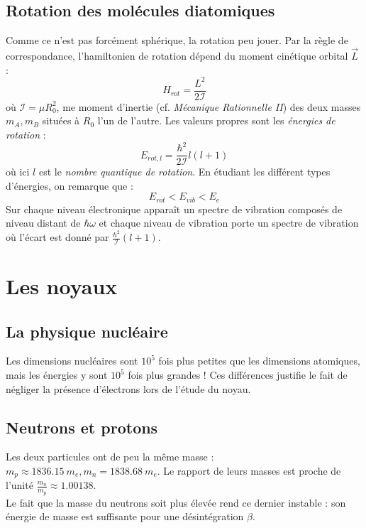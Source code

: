 \documentclass	[11pt, a4paper, openany]{book}
\begin{document}
\section{Rotation des molécules diatomiques}
Comme ce n'est pas forcément sphérique, la rotation peu jouer. Par la règle de correspondance, 
l'hamiltonien de rotation dépend du moment cinétique orbital $\vec{L}$ :
\begin{equation}
H_{rot} = \frac{L^2}{2\mathcal{I}}
\end{equation}
où $\mathcal{I} = \mu R_0^2$, me moment d'inertie (cf. \textit{Mécanique Rationnelle II}) des deux 
masses $m_A,m_B$ situées à $R_0$ l'un de l'autre.  Les valeurs propres sont les \textit{énergies de 
rotation} :
\begin{equation}
E_{rot,l} = \frac{\hbar^2}{2\mathcal{I}}l(l+1)
\end{equation}
où ici $l$ est le \textit{nombre quantique de rotation}. En étudiant les différent types d'énergies, 
on remarque que :
\begin{equation}
E_{rot} < E_{vib} < E_e
\end{equation}
Sur chaque niveau électronique apparaît un spectre de vibration composés de niveau distant de $\hbar
\omega$ et chaque niveau de vibration porte un spectre de vibration où l'écart est donné par 
$\frac{\hbar^2}{\mathcal{I}}(l+1)$.












\chapter{Les noyaux}
\section{La physique nucléaire}
Les dimensions nucléaires sont $10^5$ fois plus petites que les dimensions atomiques, mais les 
énergies y sont $10^5$ fois plus grandes ! Ces différences justifie le fait de négliger la 
présence d'électrons lors de l'étude du noyau.

\section{Neutrons et protons}
Les deux particules ont de peu la même masse : $m_p \approx 1836.15\ m_e, m_n = 1838.68\ m_e$. Le
rapport de leurs masses est proche de l'unité $\frac{m_n}{m_p}\approx1.00138$.\\
Le fait que la masse du neutrons soit plus élevée rend ce dernier instable : son énergie de masse 
est suffisante pour une désintégration $\beta$.\\
\end{document}
